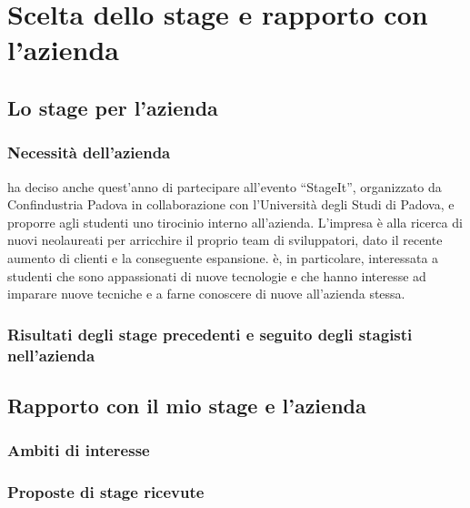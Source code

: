 \chapter{Scelta dello stage e rapporto con l'azienda}

\section{Lo stage per l'azienda}

   \subsection{Necessità dell'azienda}

   \nomeAzienda{} ha deciso anche quest'anno di partecipare all'evento ``StageIt'', organizzato da Confindustria Padova in collaborazione con l'Università degli Studi di Padova, e proporre agli studenti uno tirocinio interno all'azienda. L'impresa è alla ricerca di nuovi neolaureati per arricchire il proprio team di sviluppatori, dato il recente aumento di clienti e la conseguente espansione. \nomeAzienda{} è, in particolare, interessata a studenti che sono appassionati di nuove tecnologie e che hanno interesse ad imparare nuove tecniche e a farne conoscere di nuove all'azienda stessa.

   \subsection{Risultati degli stage precedenti e seguito degli stagisti nell'azienda}

\section{Rapporto con il mio stage e l'azienda}

   \subsection{Ambiti di interesse}

   \subsection{Proposte di stage ricevute}

